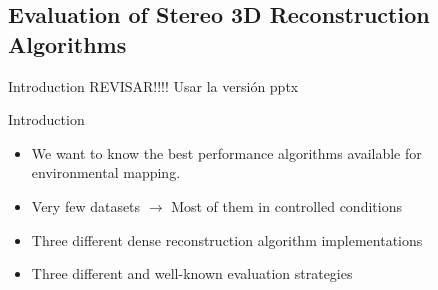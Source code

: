 \graphicspath{
  {./images/bmps/}{./images/vects/}{./images/}
  {./images/presentation/bmps/}{./images/presentation/vects/}{./images/presentation/}
  {./images/chapter00/bmps/}{./images/chapter00/vects/}{./images/chapter00/}
  {./images/chapter03/bmps/}{./images/chapter03/vects/}{./images/chapter03/}
}

\subsection{Evaluation of Stereo 3D Reconstruction Algorithms}
\begin{frame}{Introduction}
 REVISAR!!!! Usar la versión pptx
\end{frame}

\begin{frame}{Introduction}
  \begin{itemize}
    \item We want to know the best performance algorithms available for environmental mapping.
    \item Very few datasets $\rightarrow$ Most of them in controlled conditions
    \item Three different dense reconstruction algorithm implementations
    \item Three different and well-known evaluation strategies
  \end{itemize}
  
\end{frame}

